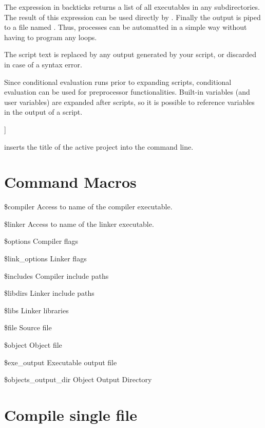 The expression in backticks returns a list of all executables  in any subdirectories. The result of this expression can be used directly by . Finally the output is piped to a file named  . Thus, processes can be automatted in a simple way without having to program any loops.


The script text is replaced by any output generated by your script, or discarded in case of a syntax error.

Since conditional evaluation runs prior to expanding scripts, conditional evaluation can be used for preprocessor functionalities. Built-in variables (and user variables) are expanded after scripts, so it is possible to reference variables in the output of a script.

\begin{code}
[[ print(GetProjectManager().GetActiveProject().GetTitle()); ]]
\end{code}

inserts the title of the active project into the command line.

\section{Command Macros}\label{sec:command_macros}

\begin{codeentry}
\item[\$compiler] Access to name of the compiler executable.
\item[\$linker] Access to name of the linker executable.
\item[\$options] Compiler flags
\item[\$link\_options] Linker flags
\item[\$includes] Compiler include paths
\item[\$libdirs] Linker include paths
\item[\$libs] Linker libraries
\item[\$file] Source file
\item[\$object] Object file
\item[\$exe\_output] Executable output file
\item[\$objects\_output\_dir] Object Output Directory
\end{codeentry}

\section{Compile single file}

